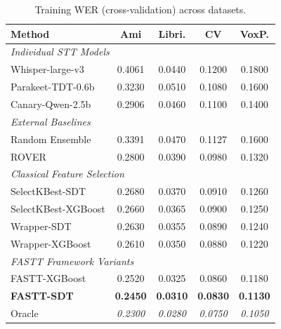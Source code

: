 \begin{table}[t]
    \centering
    \caption{Training WER (cross-validation) across datasets.}
    \label{tab:cv_train_wer} \small
    \begin{tabular}{lcccc}
        \toprule \textbf{Method}                                         & Ami             & Libri.          & CV              & VoxP.           \\
        \midrule \multicolumn{5}{l}{\textit{Individual STT Models}}       \\
        Whisper-large-v3                                                 & 0.4061          & 0.0440          & 0.1200          & 0.1800          \\
        Parakeet-TDT-0.6b                                                & 0.3230          & 0.0510          & 0.1080          & 0.1600          \\
        Canary-Qwen-2.5b                                                 & 0.2906          & 0.0460          & 0.1100          & 0.1400          \\
        \midrule \multicolumn{5}{l}{\textit{External Baselines}}          \\
        Random Ensemble                                                  & 0.3391          & 0.0470          & 0.1127          & 0.1600          \\
        ROVER                                                            & 0.2800          & 0.0390          & 0.0980          & 0.1320          \\
        \midrule \multicolumn{5}{l}{\textit{Classical Feature Selection}} \\
        SelectKBest-SDT                                                  & 0.2680          & 0.0370          & 0.0910          & 0.1260          \\
        SelectKBest-XGBoost                                              & 0.2660          & 0.0365          & 0.0900          & 0.1250          \\
        Wrapper-SDT                                                      & 0.2630          & 0.0355          & 0.0890          & 0.1240          \\
        Wrapper-XGBoost                                                  & 0.2610          & 0.0350          & 0.0880          & 0.1220          \\
        \midrule \multicolumn{5}{l}{\textit{FASTT Framework Variants}}    \\
        FASTT-XGBoost                                                    & 0.2520          & 0.0325          & 0.0860          & 0.1180          \\
        \textbf{FASTT-SDT}                                               & \textbf{0.2450} & \textbf{0.0310} & \textbf{0.0830} & \textbf{0.1130} \\
        \midrule Oracle                                                  & \textit{0.2300} & \textit{0.0280} & \textit{0.0750} & \textit{0.1050} \\
        \bottomrule
    \end{tabular}
\end{table}
